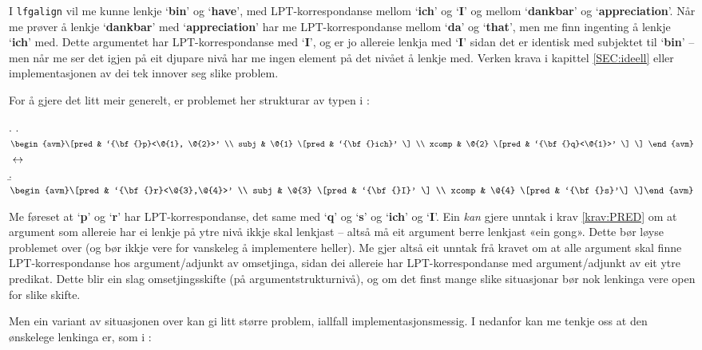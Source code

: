 \documentclass[12pt,a4paper,oneside,draft]{report}
\newcommand{\p}[1]{`\textbf{#1}'}
\begin{document}
I \texttt{lfgalign} vil me kunne lenkje \p{bin} og \p{have}, med
 LPT\hyp{}korrespondanse mellom \p{ich} og \p{I} og mellom \p{dankbar} og
 \p{appreciation}. Når me prøver å lenkje \p{dankbar} med
 \p{appreciation} har me LPT\hyp{}korrespondanse mellom \p{da} og \p{that},
 men me finn ingenting å lenkje \p{ich} med. Dette argumentet har
 LPT\hyp{}korrespondanse med \p{I}, og er jo allereie lenkja med \p{I}
 sidan det er identisk med subjektet til \p{bin} -- men når me ser det
 igjen på eit djupare nivå har me ingen element på det nivået å lenkje
 med. Verken krava i kapittel \ref{SEC:ideell} eller implementasjonen
 av dei tek innover seg slike problem.

For å gjere det litt meir generelt, er problemet her strukturar av
 typen i \Next:

{\avmoptions{}
\ex. \a. $\begin{avm}\[pred & `{\bf{}p}<\@{1}, \@{2}>'  \\
     subj & \@{1} \[pred &  `{\bf{}ich}' \] \\
     xcomp & \@{2} \[pred & `{\bf{}q}<\@{1}>' \] \] \end{avm}$
     $\\\\\leftrightarrow$\\
     \b. $\begin{avm}\[pred & `{\bf{}r}<\@{3},\@{4}>' \\
     subj & \@{3} \[pred &  `{\bf{}I}' \]  \\
     xcomp & \@{4} \[pred & `{\bf{}s}'\] \]\end{avm}$

}

Me føreset at \p{p} og \p{r} har LPT\hyp{}korrespondanse, det same med
 \p{q} og \p{s} og \p{ich} og \p{I}. Ein \emph{kan} gjere unntak i krav
 \ref{krav:PRED} om at argument som allereie har ei lenkje på ytre
 nivå ikkje skal lenkjast -- altså må eit argument berre lenkjast «ein
 gong». Dette bør løyse problemet over (og bør ikkje vere for
 vanskeleg å implementere heller). Me gjer altså eit unntak frå kravet
 om at alle argument skal finne LPT\hyp{}korrespondanse hos
 argument/adjunkt av omsetjinga, sidan dei allereie har
 LPT\hyp{}korrespondanse med argument/adjunkt av eit ytre
 predikat. Dette blir ein slag omsetjingsskifte (på
 argumentstrukturnivå), og om det finst mange slike situasjonar bør
 nok lenkinga vere open for slike skifte.

Men ein variant av situasjonen over kan gi litt større problem,
 iallfall implementasjonsmessig. I \NNext nedanfor kan me tenkje oss at den
 ønskelege lenkinga er, som i \Last:
\end{document}

